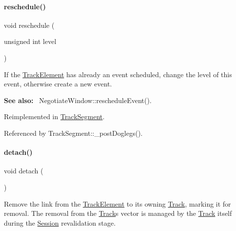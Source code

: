 \mbox{\label{classKite_1_1TrackElement_a0ffe603ec7d46f21f5e56ccbe84c03fb}} 
\paragraph{\texorpdfstring{reschedule()}{reschedule()}}
{\footnotesize\ttfamily void reschedule (\begin{DoxyParamCaption}\item[{unsigned int}]{level }\end{DoxyParamCaption})\hspace{0.3cm}{\ttfamily [virtual]}}

If the \hyperlink{classKite_1_1TrackElement}{Track\+Element} has already an event scheduled, change the level of this event, otherwise create a new event.

{\bfseries See also\+:}~ Negotiate\+Window\+::reschedule\+Event(). 

Reimplemented in \hyperlink{classKite_1_1TrackSegment_a0ffe603ec7d46f21f5e56ccbe84c03fb}{Track\+Segment}.



Referenced by Track\+Segment\+::\+\_\+post\+Doglegs().

\mbox{\label{classKite_1_1TrackElement_ac295bade8aee589f6718dfa79edc2a34}} 
\paragraph{\texorpdfstring{detach()}{detach()}}
{\footnotesize\ttfamily void detach (\begin{DoxyParamCaption}{ }\end{DoxyParamCaption})\hspace{0.3cm}{\ttfamily [virtual]}}

Remove the link from the \hyperlink{classKite_1_1TrackElement}{Track\+Element} to it\textquotesingle{}s owning \hyperlink{classKite_1_1Track}{Track}, marking it for removal. The removal from the \hyperlink{classKite_1_1Track}{Track}\textquotesingle{}s vector is managed by the \hyperlink{classKite_1_1Track}{Track} itself during the \hyperlink{classKite_1_1Session}{Session} revalidation stage. 

